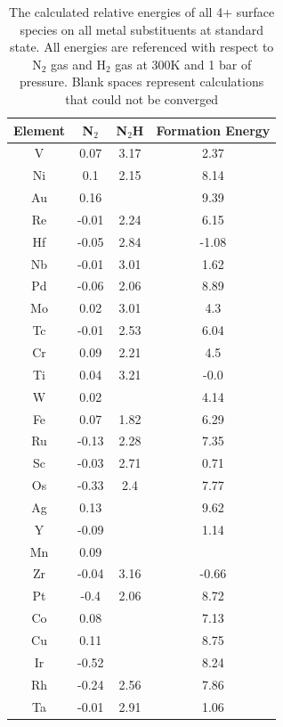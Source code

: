\documentclass{article}
\begin{document}
\begin{table}
\begin{center}
\begin{tabular}{| c | c | c | c |}
\hline
Element & N$_2$ & N$_2$H & Formation Energy \\
\hline
V & 0.07 & 3.17 & 2.37 \\
Ni & 0.1 & 2.15 & 8.14 \\
Au & 0.16 &  & 9.39 \\
Re & -0.01 & 2.24 & 6.15 \\
Hf & -0.05 & 2.84 & -1.08 \\
Nb & -0.01 & 3.01 & 1.62 \\
Pd & -0.06 & 2.06 & 8.89 \\
Mo & 0.02 & 3.01 & 4.3 \\
Tc & -0.01 & 2.53 & 6.04 \\
Cr & 0.09 & 2.21 & 4.5 \\
Ti & 0.04 & 3.21 & -0.0 \\
W & 0.02 &  & 4.14 \\
Fe & 0.07 & 1.82 & 6.29 \\
Ru & -0.13 & 2.28 & 7.35 \\
Sc & -0.03 & 2.71 & 0.71 \\
Os & -0.33 & 2.4 & 7.77 \\
Ag & 0.13 &  & 9.62 \\
Y & -0.09 &  & 1.14 \\
Mn & 0.09 &  &  \\
Zr & -0.04 & 3.16 & -0.66 \\
Pt & -0.4 & 2.06 & 8.72 \\
Co & 0.08 &  & 7.13 \\
Cu & 0.11 &  & 8.75 \\
Ir & -0.52 &  & 8.24 \\
Rh & -0.24 & 2.56 & 7.86 \\
Ta & -0.01 & 2.91 & 1.06 \\
\hline
\end{tabular}
\end{center}
\label{table:4+_energies}
\caption{The calculated relative energies of all 4+ surface species on all metal substituents at standard state. All energies are referenced with respect to N$_2$ gas and H$_2$ gas at 300K and 1 bar of pressure. Blank spaces represent calculations that could not be converged}
\end{table}
\end{document}
